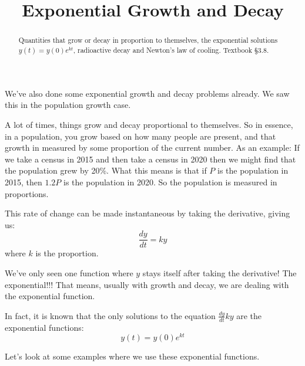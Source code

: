 \documentclass{ximera}
\title{Exponential Growth and Decay}
\begin{document}
\begin{abstract}
Quantities that grow or decay in proportion to themselves, the exponential solutions $y(t)=y(0)e^{kt}$, radioactive decay and Newton's law of cooling. Textbook §3.8.
\end{abstract}
\maketitle

We've also done some exponential growth and decay problems already. We saw this in the population growth case.

A lot of times, things grow and decay proportional to themselves. So in essence, in a population, you grow based on how many people are present, and that growth in measured by some proportion of the current number. As an example: If we take a census in 2015 and then take a census in 2020 then we might find that the population grew by 20\%. What this means is that if $P$ is the population in 2015, then $1.2 P$ is the population in 2020. So the population is measured in proportions.

This rate of change can be made instantaneous by taking the derivative, giving us:
\[
\frac{d y}{d t}=k y
\]
where $k$ is the proportion.

We've only seen one function where $y$ stays itself after taking the derivative! The exponential!!! That means, usually with growth and decay, we are dealing with the exponential function.

In fact, it is known that the only solutions to the equation $\frac{d y}{d t} k y$ are the exponential functions:
\[
y(t)=y(0) e^{k t}
\]

Let's look at some examples where we use these exponential functions.
\end{document}
